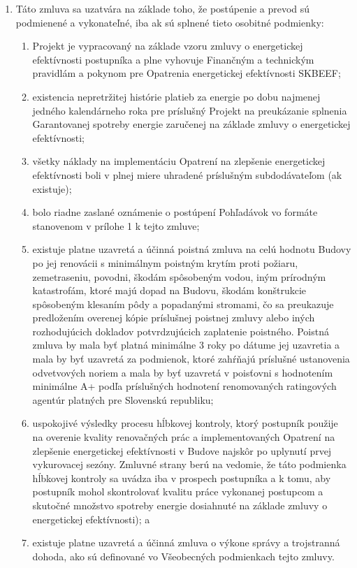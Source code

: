\documentclass[a4paper]{article}
\begin{document}
\begin{enumerate}
\item{Táto zmluva sa uzatvára na základe toho, že postúpenie a prevod sú podmienené a vykonateľné, iba ak sú splnené tieto osobitné podmienky:}

  \begin{enumerate}
    \item Projekt je vypracovaný na základe vzoru zmluvy o energetickej efektívnosti postupníka a plne vyhovuje Finančným a technickým pravidlám a pokynom pre Opatrenia energetickej efektívnosti SKBEEF;
    \item existencia nepretržitej histórie platieb za energie po dobu najmenej jedného kalendárneho roka pre príslušný Projekt na preukázanie splnenia Garantovanej spotreby energie zaručenej na základe zmluvy o energetickej efektívnosti;
    \item všetky náklady na implementáciu Opatrení na zlepšenie energetickej efektívnosti boli v plnej miere uhradené príslušným subdodávateľom (ak existuje);
    \item bolo riadne zaslané oznámenie o postúpení Pohľadávok vo formáte stanovenom v prílohe 1 k tejto zmluve;
    \item existuje platne uzavretá a účinná poistná zmluva na celú hodnotu Budovy po jej renovácii s minimálnym poistným krytím proti požiaru, zemetraseniu, povodni, škodám spôsobeným vodou, iným prírodným katastrofám, ktoré majú dopad na Budovu, škodám konštrukcie spôsobeným klesaním pôdy a popadanými stromami, čo sa preukazuje predložením overenej kópie príslušnej poistnej zmluvy alebo iných rozhodujúcich dokladov potvrdzujúcich zaplatenie poistného. Poistná zmluva by mala byť platná minimálne 3 roky po dátume jej uzavretia a mala by byť uzavretá za podmienok, ktoré zahŕňajú príslušné ustanovenia odvetvových noriem a mala by byť uzavretá v poisťovni s hodnotením minimálne A+ podľa príslušných hodnotení renomovaných ratingových agentúr platných pre Slovenskú republiku;
    \item uspokojivé výsledky procesu hĺbkovej kontroly, ktorý postupník použije na overenie kvality renovačných prác a implementovaných Opatrení na zlepšenie energetickej efektívnosti v Budove najskôr po uplynutí prvej vykurovacej sezóny. Zmluvné strany berú na vedomie, že táto podmienka hĺbkovej kontroly sa uvádza iba v prospech postupníka a k tomu, aby postupník mohol skontrolovať kvalitu práce vykonanej postupcom a skutočné množstvo spotreby energie dosiahnuté na základe zmluvy o energetickej efektívnosti); a
    \item existuje platne uzavretá a účinná zmluva o výkone správy a trojstranná dohoda, ako sú definované vo Všeobecných podmienkach tejto zmluvy.
    

\end{enumerate}
\end{enumerate}
\end{document}
